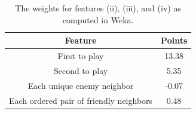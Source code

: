 \documentclass[letterpaper]{article}
\numberwithin{equation}{section}
\numberwithin{theorem}{section}
\numberwithin{lemma}{section}
\numberwithin{df}{section}
\begin{document}

\begin{table}[t]
	\centering
		\caption{The weights for features (ii), (iii), and (iv) as computed in Weka.} 
		\label{tab:MoreScoring}
		\begin{footnotesize}
		\begin{tabular}{|c|c|}
			\hline
			\textbf{Feature} & \textbf{Points} \\
			\hline
			First to play & 13.38 \\
			\hline
			Second to play & 5.35 \\
			\hline
			Each unique enemy neighbor & -0.07 \\
			\hline
			Each ordered pair of friendly neighbors & 0.48 \\
			\hline
		\end{tabular}
		\end{footnotesize}
	
\end{table}
\end{document}
